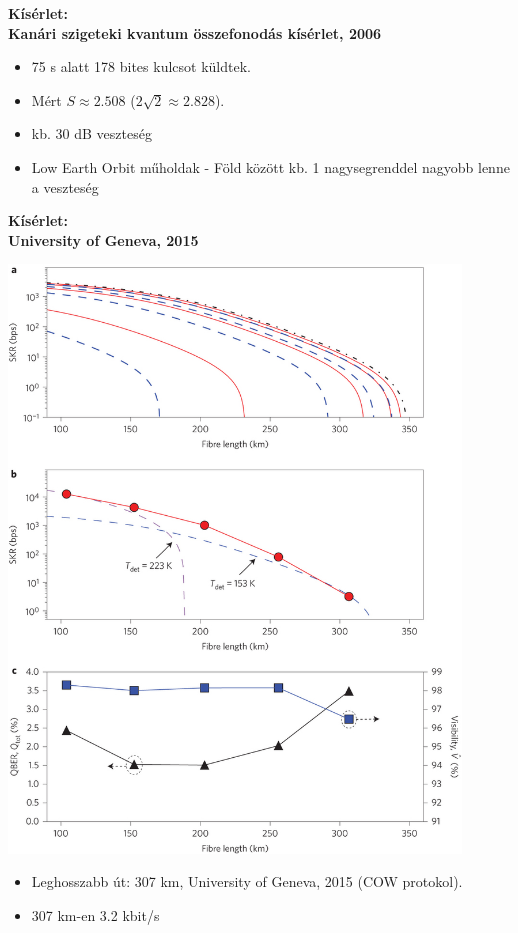 \documentclass{beamer}
\begin{document}
    \begin{frame}

        \center

        \textbf{Kísérlet:\\
            Kanári szigeteki kvantum összefonodás kísérlet, 2006}

        \begin{itemize}
            \item 75 s alatt 178 bites kulcsot küldtek.
            \item Mért $S \approx 2.508$ ($2 \sqrt{2} \approx 2.828$).
            \item kb. 30 dB veszteség
            \item Low Earth Orbit műholdak - Föld között kb. 1 nagysegrenddel nagyobb lenne a veszteség
        \end{itemize}

    \end{frame}

    \begin{frame}

        \center

        \textbf{Kísérlet:\\
            University of Geneva, 2015}

        \includegraphics[trim={0 400px 0 400px},clip,width=0.9\textwidth]{geneva_bitrates.jpg}

        \begin{itemize}
            \item Leghosszabb út: 307 km, University of Geneva, 2015 (COW protokol).
            \item 307 km-en 3.2 kbit/s
        \end{itemize}

    \end{frame}
\end{document}
